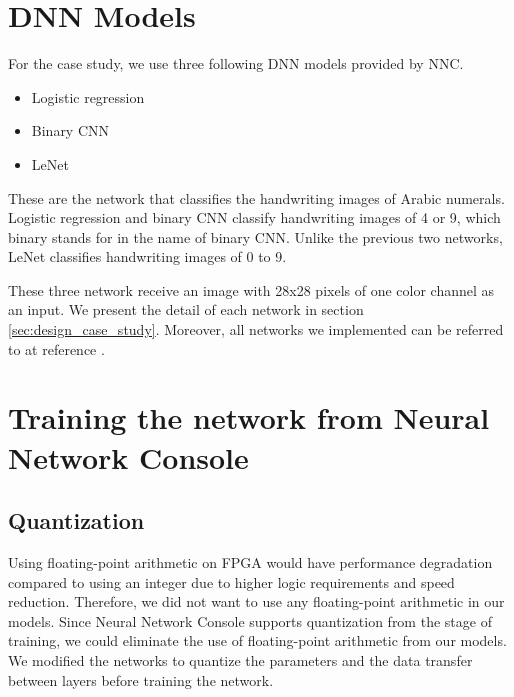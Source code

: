 \section{DNN Models}
For the case study, we use three following DNN models provided by NNC.
\begin{itemize}
  \item Logistic regression
  \item Binary CNN
  \item LeNet
\end{itemize}

These are the network that classifies the handwriting images of Arabic numerals. Logistic regression and binary CNN classify handwriting images of 4 or 9, which binary stands for in the name of binary CNN. Unlike the previous two networks, LeNet classifies handwriting images of 0 to 9.

These three network receive an image with 28x28 pixels of one color channel as an input. We present the detail of each network in section \ref{sec:design_case_study}. Moreover, all networks we implemented can be referred to at reference \cite{webpage:nnc_project}.


\section{Training the network from Neural Network Console}
\subsection{Quantization} \label{sec:quantization}

Using floating-point arithmetic on FPGA would have performance degradation compared to using an integer due to higher logic requirements and speed reduction. Therefore, we did not want to use any floating-point arithmetic in our models. Since Neural Network Console supports quantization from the stage of training, we could eliminate the use of floating-point arithmetic from our models. We modified the networks to quantize the parameters and the data transfer between layers before training the network.

